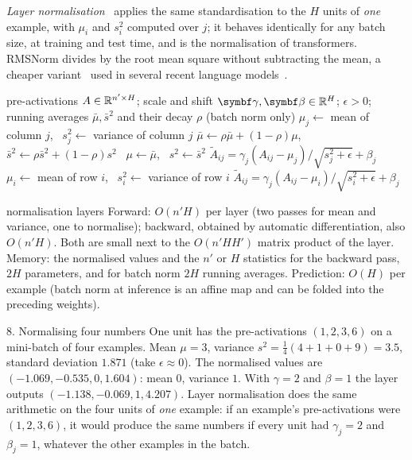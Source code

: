 \documentclass[11pt]{article}
\begin{document}
\emph{Layer normalisation}~\cite{ba2016} applies the same standardisation to the $H$ units of \emph{one} example, with
$\mu_i$ and $s_i^2$ computed over $j$; it behaves identically for any batch size, at training and test time, and is the
normalisation of transformers. RMSNorm divides by the root mean square without subtracting the mean, a cheaper
variant~\cite{zhang2019} used in several recent language models~\cite{touvron2023}.

\begin{algorithm}[H]
\caption{Batch normalisation and layer normalisation (forward pass)}\label{alg:norm}
\begin{algorithmic}[1]
\Require pre-activations $A \in \mathbb{R}^{n' \times H}$; scale and shift $\vect{\gamma}, \vect{\beta} \in \R^H$; $\epsilon > 0$;
  running averages $\bar{\mu}, \bar{s}^2$ and their decay $\rho$ (batch norm only)
    \State $\mu_j \gets$ mean of column $j$, \ $s_j^2 \gets$ variance of column $j$ 
    \State $\bar{\mu} \gets \rho\bar{\mu} + (1 - \rho)\mu$, \ $\bar{s}^2 \gets \rho\bar{s}^2 + (1 - \rho)s^2$ 
  \Else \ $\mu \gets \bar{\mu}$, \ $s^2 \gets \bar{s}^2$
  \EndIf
  \State \Return $\tilde{A}_{ij} = \gamma_j(A_{ij} - \mu_j)/\sqrt{s_j^2 + \epsilon} + \beta_j$
\EndFunction
{} 
  \State $\mu_i \gets$ mean of row $i$, \ $s_i^2 \gets$ variance of row $i$ 
  \State \Return $\tilde{A}_{ij} = \gamma_j(A_{ij} - \mu_i)/\sqrt{s_i^2 + \epsilon} + \beta_j$
\EndFunction
\end{algorithmic}
\end{algorithm}

\begin{runtime}{normalisation layers}
Forward: $O(n'H)$ per layer (two passes for mean and variance, one to normalise); backward, obtained by automatic
differentiation, also $O(n'H)$. Both are small next to the $O(n'HH')$ matrix product of the layer. Memory: the normalised
values and the $n'$ or $H$ statistics for the backward pass, $2H$ parameters, and for batch norm $2H$ running averages.
Prediction: $O(H)$ per example (batch norm at inference is an affine map and can be folded into the preceding weights).
\end{runtime}

\begin{worked}{8. Normalising four numbers}
One unit has the pre-activations $(1, 2, 3, 6)$ on a mini-batch of four examples. Mean $\mu = 3$, variance
$s^2 = \frac14(4 + 1 + 0 + 9) = 3.5$, standard deviation $1.871$ (take $\epsilon \approx 0$). The normalised values are
$(-1.069, -0.535, 0, 1.604)$: mean $0$, variance $1$. With $\gamma = 2$ and $\beta = 1$ the layer outputs
$(-1.138, -0.069, 1, 4.207)$. Layer normalisation does the same arithmetic on the four units of \emph{one} example: if
an example's pre-activations were $(1, 2, 3, 6)$, it would produce the same numbers if every unit had $\gamma_j = 2$
and $\beta_j = 1$, whatever the other examples in the batch.
\end{worked}
\end{document}
